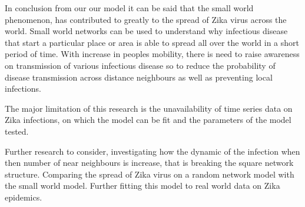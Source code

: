 In conclusion from our our model it can be said that the small world phenomenon, has contributed to greatly to the spread of Zika virus across the world.
Small world networks can be used to understand why infectious disease that start
a particular place or area is able to spread all over the world in a short period of time. With increase in peoples
mobility, there is need to raise awareness on transmission of various infectious disease
so to reduce the probability of disease transmission across distance
neighbours
as well as preventing local infections.

The major limitation of this research is the unavailability of time series data on Zika infections, on which the model can be fit and the parameters of the model tested.

Further research to consider, investigating how the dynamic of the infection when then number of near neighbours is increase, that is breaking the square network structure. Comparing the spread of Zika virus on a random network model with the small world model. Further fitting this model to real world data on Zika epidemics.
